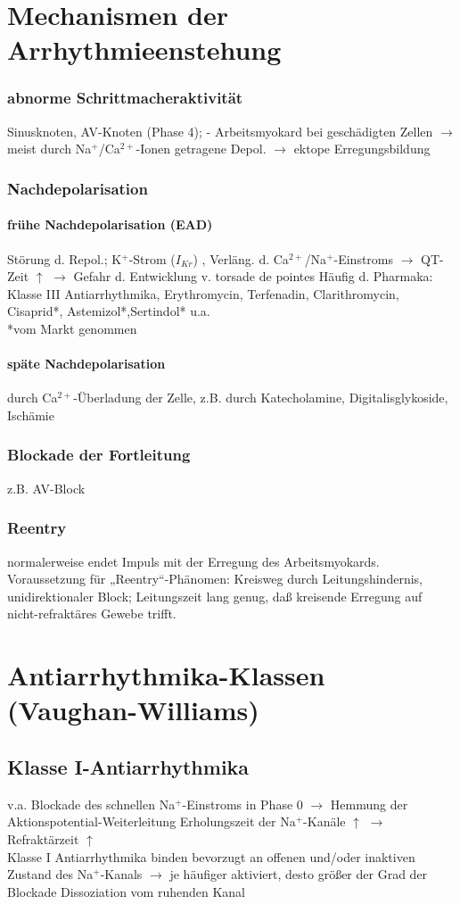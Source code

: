 \documentclass[10pt,a4paper]{report}
\begin{document}
\section{Mechanismen der Arrhythmieenstehung}
\subsubsection{abnorme Schrittmacheraktivität} Sinusknoten, AV-Knoten (Phase 4); - Arbeitsmyokard bei geschädigten Zellen $\rightarrow$ meist durch Na$^+$/Ca$^{2+}$-Ionen getragene Depol. $\rightarrow$ ektope Erregungsbildung
\subsubsection{Nachdepolarisation}
\paragraph{frühe Nachdepolarisation (EAD)} Störung d. Repol.; K$^+$-Strom ($I_{Kr}$) , Verläng. d. Ca$^{2+}$/Na$^+$-Einstroms $\rightarrow$ QT-Zeit $\uparrow$ $\rightarrow$ Gefahr d. Entwicklung v. torsade de pointes Häufig d. Pharmaka: Klasse III Antiarrhythmika, Erythromycin,	Terfenadin, Clarithromycin, Cisaprid*, Astemizol*,Sertindol* u.a.\\
*vom Markt genommen
\paragraph{späte Nachdepolarisation} durch Ca$^{2+}$-Überladung der Zelle, z.B. durch	Katecholamine, Digitalisglykoside, Ischämie
\subsubsection{Blockade der Fortleitung}z.B. AV-Block
\subsubsection{Reentry} normalerweise endet Impuls mit der Erregung des Arbeitsmyokards. Voraussetzung für „Reentry“-Phänomen: Kreisweg durch Leitungshindernis, unidirektionaler Block; Leitungszeit lang genug, daß kreisende Erregung auf nicht-refraktäres Gewebe trifft.
\section{Antiarrhythmika-Klassen (Vaughan-Williams)}
\subsection{Klasse I-Antiarrhythmika}
v.a. Blockade des schnellen Na$^+$-Einstroms in Phase 0 $\rightarrow$ Hemmung der Aktionspotential-Weiterleitung	Erholungszeit der Na$^+$-Kanäle $\uparrow$ $\rightarrow$ Refraktärzeit $\uparrow$ \\
Klasse I Antiarrhythmika binden bevorzugt an offenen und/oder inaktiven Zustand des Na$^+$-Kanals $\rightarrow$ je häufiger aktiviert, desto größer der Grad der Blockade Dissoziation vom ruhenden Kanal
\end{document}

